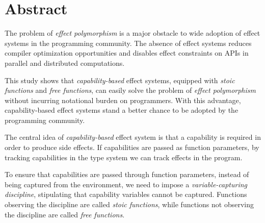 \section*{\centering Abstract}

The problem of \emph{effect polymorphism} is a major obstacle to wide
adoption of effect systems in the programming community. The absence
of effect systems reduces compiler optimization opportunities and
disables effect constraints on APIs in parallel and distributed
computations.

This study shows that \emph{capability-based} effect systems, equipped
with \emph{stoic functions} and \emph{free functions}, can easily
solve the problem of \emph{effect polymorphism} without incurring
notational burden on programmers. With this advantage,
capability-based effect systems stand a better chance to be adopted by
the programming community.

The central idea of \emph{capability-based} effect system is that a
capability is required in order to produce side effects. If
capabilities are passed as function parameters, by tracking
capabilities in the type system we can track effects in the program.

To ensure that capabilities are passed through function parameters,
instead of being captured from the environment, we need to impose a
\emph{variable-capturing discipline}, stipulating that capability
variables cannot be captured. Functions observing the discipline are
called \emph{stoic functions}, while functions not observing the
discipline are called \emph{free functions}.
